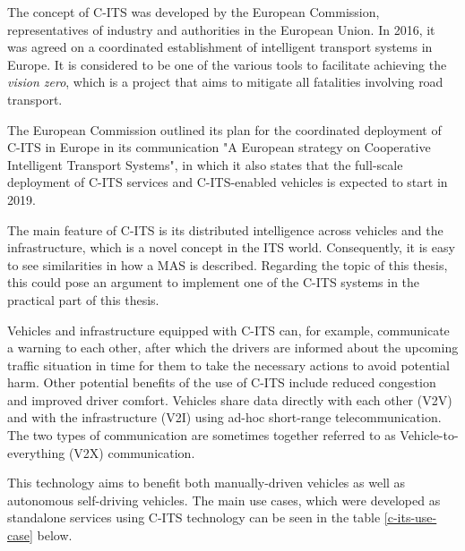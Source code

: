 \documentclass[0main.tex]{subfiles}
\begin{document}
The concept of C-ITS was developed by the European Commission, representatives of industry and 
authorities in the European Union. In 2016, it was agreed on a coordinated establishment of intelligent
transport systems in Europe. It is considered to be one of the various tools to facilitate achieving 
the \emph{vision zero}, which is a project that aims to mitigate all fatalities involving road 
transport.

The European Commission outlined its plan for the coordinated deployment of C-ITS in Europe in
its communication "A European strategy on Cooperative Intelligent Transport Systems", in which
it also states that the full-scale deployment of C-ITS services and C-ITS-enabled vehicles is
expected to start in 2019.

The main feature of C-ITS is its distributed intelligence across vehicles and the infrastructure, 
which is a novel concept in the ITS world. Consequently, it is easy to see similarities in how a
MAS is described. Regarding the topic of this thesis, this could pose an argument to
implement one of the C-ITS systems in the practical part of this thesis.

Vehicles and infrastructure equipped with C-ITS can, for example, communicate a warning to each
other, after which the drivers are informed about the upcoming traffic situation in time for
them to take the necessary actions to avoid potential harm. Other potential benefits
of the use of C-ITS include reduced congestion and improved driver comfort. Vehicles 
share data directly with each other (V2V) and with the infrastructure (V2I) using ad-hoc
short-range telecommunication. The two types of communication are sometimes together referred 
to as Vehicle-to-everything (V2X) communication.

This technology aims to benefit both manually-driven vehicles 
as well as autonomous self-driving vehicles. The main use cases, which were developed as
standalone services using C-ITS technology can be seen in the table \ref{c-its-use-case}
below.
\end{document}
